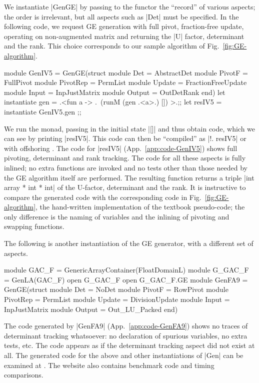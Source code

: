 \documentclass{elsart}
\begin{document}
We instantiate |GenGE| by passing to the functor the ``record'' of
various aspects; the order is irrelevant, but all aspects such as
|Det| must be specified. In the following code, we request GE generation
with full pivot, fraction-free update, operating on non-augmented matrix
and returning the |U| factor, determinant and the rank. This choice
corresponds to our sample algorithm of Fig.~\ref{fig:GE-algorithm}.
\begin{code}
module GenIV5 = GenGE(struct 
    module Det      = AbstractDet
    module PivotF   = FullPivot
    module PivotRep = PermList
    module Update   = FractionFreeUpdate
    module Input    = InpJustMatrix
    module Output   = OutDetRank end)
let instantiate gen =
    .<fun a -> .~(runM (gen .<a>.) []) >.;;
let resIV5 = instantiate GenIV5.gen ;;
\end{code}
We run the monad, passing in the initial state |[]| and thus obtain code,
which we can see by printing |resIV5|. This code can then be
``compiled'' as |!. resIV5| or with offshoring \cite{offshoring}. The
code for |resIV5| (App.~\ref{app:code-GenIV5}) shows full pivoting,
determinant and rank tracking. The code for all these aspects is fully
inlined; no extra functions are invoked and no tests other than those
needed by the GE algorithm itself are performed. The resulting
function returns a triple |int array * int * int| of the U-factor,
determinant and the rank. It is instructive to compare the generated
code with the corresponding code in Fig.~\ref{fig:GE-algorithm}, the
hand-written implementation of the textbook pseudo-code; the only
difference is the naming of variables and the inlining of pivoting and
swapping functions.

The following is another instantiation of the GE generator, with a
different set of aspects.
\begin{code}
module GAC_F = GenericArrayContainer(FloatDomainL)
module G_GAC_F = GenLA(GAC_F)
open G_GAC_F
open G_GAC_F.GE
module GenFA9 = GenGE(struct 
    module Det      = NoDet
    module PivotF   = RowPivot
    module PivotRep = PermList
    module Update   = DivisionUpdate
    module Input    = InpJustMatrix
    module Output   = Out_LU_Packed end)
\end{code}
The code generated by |GenFA9| (App.~\ref{app:code-GenFA9}) shows no traces of
determinant tracking whatsoever: no declaration of spurious variables,
no extra tests, etc. The code appears as if the determinant tracking
aspect did not exist at all. The generated code for the above and
other instantiations of |Gen| can be examined at
\cite{metamonadsURL}. The website also contains benchmark code and
timing comparisons.
\end{document}
